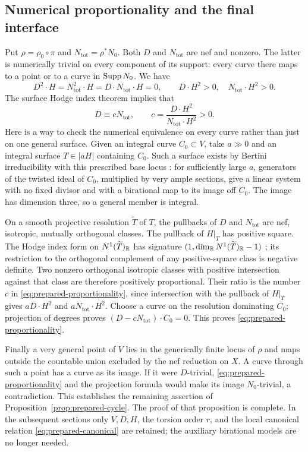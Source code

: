 \subsection{Numerical proportionality and the final interface}

Put \(\rho=\rho_0\circ\pi\) and \(N_{\mathrm{tot}}=\rho^*N_0\).
Both \(D\) and \(N_{\mathrm{tot}}\) are nef and nonzero.
The latter is numerically trivial on every component of its support:
every curve there maps to a point or to a curve in \(\operatorname{Supp} N_0\).
We have
\[
 D^2\cdot H=N_{\mathrm{tot}}^2\cdot H
           =D\cdot N_{\mathrm{tot}}\cdot H=0,
 \qquad D\cdot H^2>0,\quad N_{\mathrm{tot}}\cdot H^2>0.
\]
The surface Hodge index theorem implies that
\begin{equation}
\label{eq:prepared-proportionality}
 D\equiv cN_{\mathrm{tot}},\qquad
 c=\frac{D\cdot H^2}{N_{\mathrm{tot}}\cdot H^2}>0.
\end{equation}
Here is a way to check the numerical equivalence on every curve rather
than just on one general surface.
Given an integral curve \(C_0\subset V\), take \(a\gg0\) and an integral
surface \(T\in|aH|\) containing \(C_0\).
Such a surface exists by Bertini irreducibility with this prescribed
base locus \cite{jouanolou1983}: for sufficiently large \(a\), generators
of the twisted ideal of \(C_0\), multiplied by very ample sections,
give a linear system with no fixed divisor and with a birational map
to its image off \(C_0\).
The image has dimension three, so a general member is integral.

On a smooth projective resolution \(\widetilde T\) of \(T\), the pullbacks of \(D\) and
\(N_{\mathrm{tot}}\) are nef, isotropic, mutually orthogonal classes.
The pullback of \(H|_T\) has positive square.
The Hodge index form on \(N^1(\widetilde T)_{\mathbb R}\) has signature
\((1,\dim_{\mathbb R}N^1(\widetilde T)_{\mathbb R}-1)\)
\cite[V, Section~1]{hartshorne1977}; its restriction to the orthogonal
complement of any positive-square class is negative definite.
Two nonzero orthogonal isotropic classes with positive intersection
against that class are therefore positively proportional.
Their ratio is the number \(c\) in \eqref{eq:prepared-proportionality},
since intersection with the pullback of \(H|_T\) gives
\(aD\cdot H^2\) and \(aN_{\mathrm{tot}}\cdot H^2\).
Choose a curve on the resolution dominating \(C_0\); projection of
degrees proves \((D-cN_{\mathrm{tot}})\cdot C_0=0\).
This proves \eqref{eq:prepared-proportionality}.

Finally a very general point of \(V\) lies in the generically finite
locus of \(\rho\) and maps outside the countable union excluded by the
nef reduction on \(X\).
A curve through such a point has a curve as its image.
If it were \(D\)-trivial, \eqref{eq:prepared-proportionality} and the
projection formula would make its image \(N_0\)-trivial, a contradiction.
This establishes the remaining assertion of
Proposition~\ref{prop:prepared-cycle}.
The proof of that proposition is complete.
In the subsequent sections only $V,D,H$, the torsion order $r$, and the
local canonical relation \eqref{eq:prepared-canonical} are retained;
the auxiliary birational models are no longer needed.

